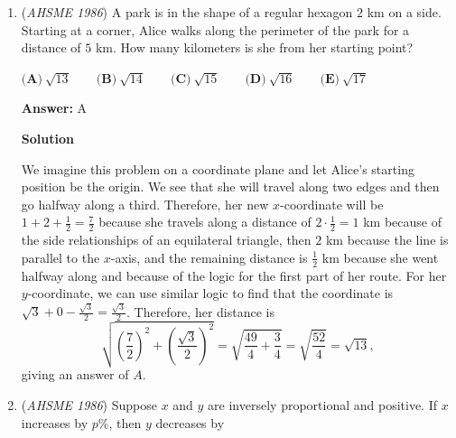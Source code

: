 \begin{enumerate}
The length of the minor axis is the distance from the opposite points of the cylinder, which is simply $2 \cdot 1 =2$, and according to the question, the length of the major axis is simply $2 \cdot 150\% = \boxed{(E) 3}$




\textbf{Solution 2}

We note that we can draw the minor axis to see that because the minor axis is the minimum distance between two opposite points on the ellipse, we can draw a line through two opposite points of the cylinder, and so the minor axis is $2(1) = 2$. Therefore, our answer is $2(1.5) = 3$, and so our answer is $\boxed{E}$.

 


	\item (\textit{AHSME 1986}) A park is in the shape of a regular hexagon $2$ km on a side. Starting at a corner, 
Alice walks along the perimeter of the park for a distance of $5$ km. 
How many kilometers is she from her starting point?


 $\textbf{(A)}\ \sqrt{13}\qquad \textbf{(B)}\ \sqrt{14}\qquad \textbf{(C)}\ \sqrt{15}\qquad \textbf{(D)}\ \sqrt{16}\qquad \textbf{(E)}\ \sqrt{17}$

 \textbf{Answer: }A



\textbf{Solution}

We imagine this problem on a coordinate plane and let Alice's starting position be the origin. We see that she will travel along two edges and then go halfway along a third. Therefore, her new $x$-coordinate will be $1 + 2 + \frac{1}{2} = \frac{7}{2}$ because she travels along a distance of $2 \cdot \frac{1}{2} = 1$ km because of the side relationships of an equilateral triangle, then $2$ km because the line is parallel to the $x$-axis, and the remaining  distance is $\frac{1}{2}$ km because she went halfway along and because of the logic for the first part of her route. For her $y$-coordinate, we can use similar logic to find that the coordinate is $\sqrt{3} + 0 - \frac{\sqrt{3}}{2} =  \frac{\sqrt{3}}{2}$. Therefore, her distance is 
 \[\sqrt{\left(\frac{7}{2}\right)^2 + \left(\frac{\sqrt{3}}{2}\right)^2} = \sqrt{\frac{49}{4} + \frac{3}{4}} = \sqrt{\frac{52}{4}} = \sqrt{13},\] giving an answer of $\boxed{A}$.

 


	\item (\textit{AHSME 1986}) Suppose $x$ and $y$ are inversely proportional and positive. If $x$ increases by $p\%$, then $y$ decreases by 



\end{enumerate}
